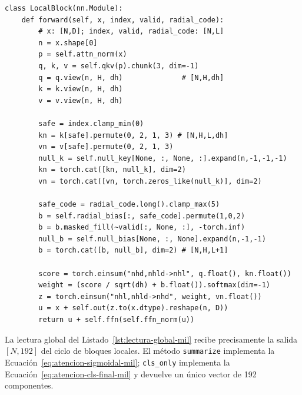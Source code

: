 \begin{lstlisting}[basicstyle=\ttfamily\footnotesize,caption={Bloque local MIL en seudocódigo estilo PyTorch.},label={lst:atencion-local-mil}]
class LocalBlock(nn.Module):
    def forward(self, x, index, valid, radial_code):
        # x: [N,D]; index, valid, radial_code: [N,L]
        n = x.shape[0]
        p = self.attn_norm(x)
        q, k, v = self.qkv(p).chunk(3, dim=-1)
        q = q.view(n, H, dh)              # [N,H,dh]
        k = k.view(n, H, dh)
        v = v.view(n, H, dh)

        safe = index.clamp_min(0)
        kn = k[safe].permute(0, 2, 1, 3) # [N,H,L,dh]
        vn = v[safe].permute(0, 2, 1, 3)
        null_k = self.null_key[None, :, None, :].expand(n,-1,-1,-1)
        kn = torch.cat([kn, null_k], dim=2)
        vn = torch.cat([vn, torch.zeros_like(null_k)], dim=2)

        safe_code = radial_code.long().clamp_max(5)
        b = self.radial_bias[:, safe_code].permute(1,0,2)
        b = b.masked_fill(~valid[:, None, :], -torch.inf)
        null_b = self.null_bias[None, :, None].expand(n,-1,-1)
        b = torch.cat([b, null_b], dim=2) # [N,H,L+1]

        score = torch.einsum("nhd,nhld->nhl", q.float(), kn.float())
        weight = (score / sqrt(dh) + b.float()).softmax(dim=-1)
        z = torch.einsum("nhl,nhld->nhd", weight, vn.float())
        u = x + self.out(z.to(x.dtype).reshape(n, D))
        return u + self.ffn(self.ffn_norm(u))
\end{lstlisting}

La lectura global del Listado~\ref{lst:lectura-global-mil} recibe precisamente
la salida \([N,192]\) del ciclo de bloques locales. El método
\texttt{summarize} implementa la Ecuación~\eqref{eq:atencion-sigmoidal-mil};
\texttt{cls\_only} implementa la Ecuación~\eqref{eq:atencion-cls-final-mil} y
devuelve un único vector de 192 componentes.

